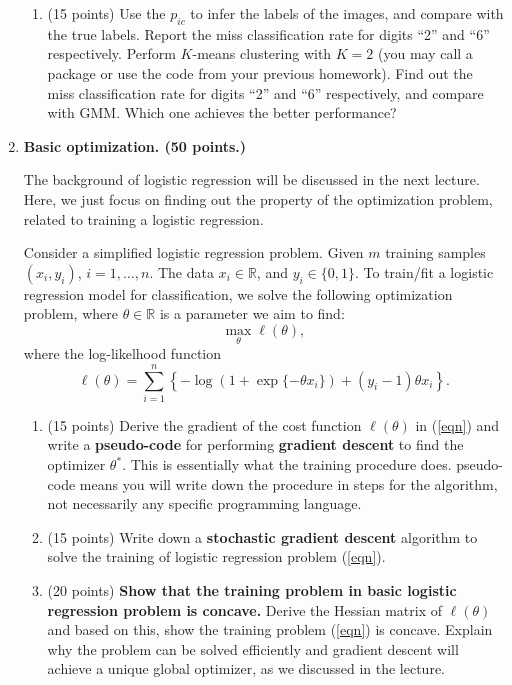 \documentclass[twoside,10pt]{article}
\begin{document}
\begin{enumerate}
\begin{enumerate}
\item (15 points) Use the $p_{ic}$ to infer the labels of the images, and compare with the true labels. Report the miss classification rate for digits ``2'' and ``6'' respectively. Perform $K$-means clustering with $K=2$ (you may call a package or use the code from your previous homework). Find out the  miss classification rate for digits ``2'' and ``6'' respectively, and compare with GMM. Which one achieves the better performance?


\end{enumerate}

\clearpage

\item {\bf Basic optimization. (50 points.)}

The background of logistic regression will be discussed in the next lecture. Here, we just focus on finding out the property of the optimization problem, related to training a logistic regression. 

Consider a simplified logistic regression problem. 
Given $m$ training samples $(x_i, y_i)$, $i = 1, \ldots, n$. The data $x_i \in \mathbb R$, and $y_i \in \{0, 1\}$.  To train/fit a logistic regression model for classification, we solve the following optimization problem, where $\theta \in \mathbb R$ is a parameter we aim to find:
\begin{equation}
\max_\theta \ell (\theta), \label{eqn}
\end{equation}
where the log-likelhood function \[\ell(\theta) = \sum_{i=1}^n \left\{-\log (1+\exp\{-\theta x_i\}) + (y_i-1) \theta x_i\right\}.\]

\begin{enumerate}
\item (15 points) Derive the gradient of the cost function $\ell(\theta)$ in (\ref{eqn}) and write a {\bf pseudo-code} for performing {\bf gradient descent} to find the optimizer $\theta^*$. This is essentially what the training procedure does. pseudo-code  means you will write down the procedure in steps for the algorithm, not necessarily any specific programming language. 
\item (15 points) Write down a {\bf stochastic gradient descent} algorithm to solve the training of logistic regression problem (\ref{eqn}). 
\item (20 points) {\bf Show that the training problem in basic logistic regression problem is concave.} Derive the Hessian matrix of $\ell(\theta)$ and based on this, show the training problem (\ref{eqn}) is concave. Explain why the problem can be solved efficiently and gradient descent will achieve a unique global optimizer, as we discussed in the lecture. 


\end{enumerate}
\end{enumerate}
\end{document}
